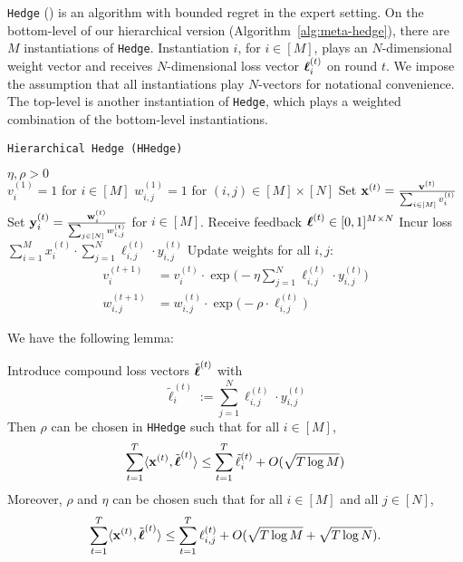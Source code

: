 \texttt{Hedge} (\cite{chang:05}) is an algorithm with bounded regret in the expert setting.
On the bottom-level of our hierarchical version (Algorithm~\ref{alg:meta-hedge}), there are $M$ instantiations of \texttt{Hedge}. Instantiation $i$, for $i\in[M]$, plays an $N$-dimensional weight vector and receives $N$-dimensional loss vector $\boldsymbol\ell^{(t)}_{i}$ on round $t$. We impose the assumption that all instantiations play $N$-vectors for notational convenience. The top-level is another instantiation of \texttt{Hedge}, which plays a weighted combination of the bottom-level instantiations.

\begin{algorithm}
   \caption{\texttt{Hierarchical Hedge (HHedge)}}
   \label{alg:meta-hedge}
   \begin{algorithmic}   
   	 $\eta,\rho>0$\\
   	\STATE $v^{(1)}_{i}=1$ for $i\in[M]$
   	\STATE $w^{(1)}_{i,j}=1$ for $(i,j)\in[M]\times[N]$
	   \STATE Set ${\mathbf x}^{(t)} = \frac{{\mathbf v}^{(t)}}{\sum_{i\in[M]} v^{(t)}_{i}}$
	   \STATE Set ${\mathbf y}^{(t)}_{i} = \frac{{\mathbf w}^{(t)}_{i}}{\sum_{j\in[N]} w^{(t)}_{i,j}}$ for $i\in[M]$.
		\STATE Receive feedback $\boldsymbol\ell^{(t)}\in [0,1]^{M\times N}$ %
		\STATE Incur loss $\sum_{i=1}^{M} x^{(t)}_{i}\cdot\sum_{j=1}^N\ell^{(t)}_{i,j}\cdot y^{(t)}_{i,j}$
		\STATE Update weights for all $i,j$:
		\begin{align}
			v^{(t+1)}_i & = v^{(t)}_{i}\cdot \exp\big(-\eta \sum_{j=1}^N\ell^{(t)}_{i,j}\cdot y^{(t)}_{i,j}\big)
			\\
			w^{(t+1)}_{i,j} & = w^{(t)}_{i,j}\cdot \exp\big(-\rho\cdot \ell^{(t)}_{i,j}\big)
		\end{align}
    	\ENDFOR
   	\end{algorithmic}
\end{algorithm}

We have the following lemma:

\begin{lem}\label{lem:meta-hedge}
	Introduce compound loss vectors $\tilde{\boldsymbol\ell}^{(t)}$ with 
	$$\tilde{\ell}^{(t)}_i := \sum_{j=1}^N \ell^{(t)}_{i,j}\cdot y^{(t)}_{i,j}$$
	Then $\rho$ can be chosen in \texttt{HHedge} such that for all $i\in[M]$,
	\begin{equation}
		\sum_{t=1}^T \langle {\mathbf x}^{(t)},\tilde{\boldsymbol\ell}^{(t)}\rangle 
		\leq  \sum_{t=1}^T \tilde{\ell}^{(t)}_i +
		 O(\sqrt{T \log M})
	\end{equation}
	Moreover, $\rho$ and $\eta$ can be chosen such that for all $i\in[M]$ and all $j\in[N]$,
	\begin{equation}
	   \sum_{t=1}^T \langle {\mathbf x}^{(t)},\tilde{\boldsymbol\ell}^{(t)}\rangle 
		\leq \sum_{t=1}^T\ell^{(t)}_{i,j}
		+ O(\sqrt{T \log M} + \sqrt{T \log N}).
	\end{equation}
\end{lem}


